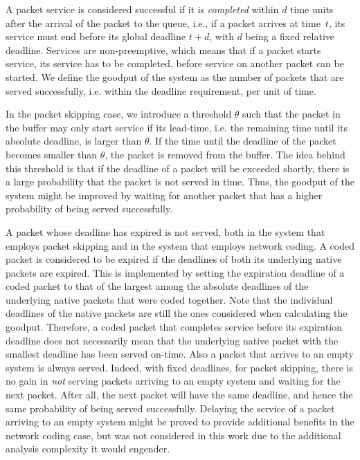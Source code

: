 \documentclass[preprint,12pt]{elsarticle}
\theoremstyle{definition}
\theoremstyle{plain}
\theoremstyle{remark}
\begin{document}
A packet service is considered successful if it is \emph{completed} within $d$ time units after the arrival of the packet to the queue, i.e., if a packet arrives at time~$t$, its service must end before its global deadline $t+d$, with $d$ being a fixed relative deadline. Services are non-preemptive, which means that if a packet starts service, its service has to be completed, before service on another packet can be started. We define the goodput of the system as the number of packets that are served successfully, i.e. within the deadline requirement, per unit of time.

In the packet skipping case, we introduce a threshold $\theta$ such that the packet in the buffer may only start service if its lead-time, i.e. the remaining time until its absolute deadline, is larger than $\theta$. If the time until the deadline of the packet becomes smaller than $\theta$, the packet is removed from the buffer. The idea behind this threshold is that if the deadline of a packet will be exceeded shortly, there is a large probability that the packet is not served in time. Thus, the goodput of the system might be improved by waiting for another packet that has a higher probability of being served successfully.

A packet whose deadline has expired is not served, both in the system that employs packet skipping and in the system that employs network coding. A coded packet is considered to be expired if the deadlines of both its underlying native packets are expired. This is implemented by setting the expiration deadline of a coded packet to that of the largest among the absolute deadlines of the underlying native packets that were coded together. Note that the individual deadlines of the native packets are still the ones considered when calculating the goodput. Therefore, a coded packet that completes service before its expiration deadline does not necessarily mean that the underlying native packet with the smallest deadline has been served on-time. Also a packet that arrives to an empty system is always served. Indeed, with fixed deadlines, for packet skipping, there is no gain in \emph{not} serving packets arriving to an empty system and waiting for the next packet. After all, the next packet will have the same deadline, and hence the same probability of being served successfully. Delaying the service of a packet arriving to an empty system might be proved to provide additional benefits in the network coding case, but was not considered in this work due to the additional analysis complexity it would engender.
\end{document}
